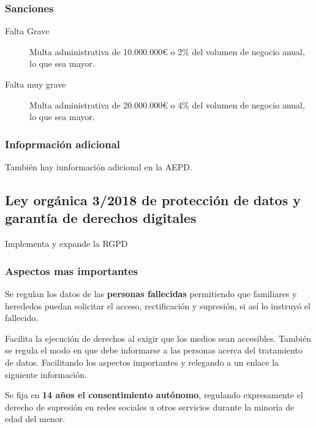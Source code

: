     \subsubsection{Sanciones}
        \begin{description}
            \item[Falta Grave] Multa administrativa de 10.000.000€ o 2\% del volumen de negocio anual, lo que sea mayor.
            \item[Falta muy grave] Multa administrativa de 20.000.000€ o 4\% del volumen de negocio anual, lo que sea mayor.
        \end{description}

    \subsubsection{Infoprmación adicional}

    También hay iunformación adicional en la AEPD.

\subsection{Ley orgánica 3/2018 de protección de datos y garantía de derechos digitales}
        Implementa y expande la RGPD
    \subsubsection{Aspectos mas importantes}
        Se regulan los datos de las \textbf{personas fallecidas} permitiendo que familiares y herededos puedan solicitar el acceso, rectificación y supresión, si así lo instruyó el fallecido.

        Facilita la ejecución de derechos al exigir que los medios sean accesibles. También se regula el modo en que debe informarse a las personas acerca del tratamiento de datos. Facilitando los aspectos importantes y relegando a un enlace la siguiente información.

        Se fija en \textbf{14 años el consentimiento autónomo}, regulando expresamente el derecho de supresión en redes sociales u otros servicios durante la minoría de edad del menor.


